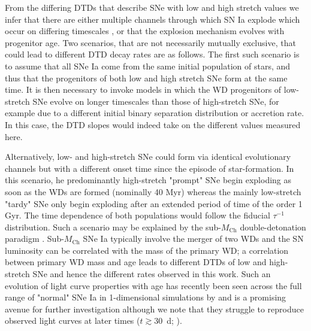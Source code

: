 \documentclass[fleqn,usenatbib]{mnras}
\providecommand{\DIFadd}[1]{\protect\cbstart{#1}\protect\cbend} %
\providecommand{\DIFaddbegin}{} %
\providecommand{\DIFaddend}{} %
\newcommand{\DIFaddincludegraphics}[2][]{{\color{blue}\fbox{\DIFOincludegraphics[#1]{#2}}}} %
\DeclareRobustCommand{\DIFaddbegin}{\DIFOaddbegin \let\includegraphics\DIFaddincludegraphics} %
\DeclareRobustCommand{\DIFaddend}{\DIFOaddend \let\includegraphics\DIFOincludegraphics} %
\begin{document}
From the differing DTDs that describe SNe with low and high stretch values we infer that there are either multiple channels through which SN Ia explode which occur on differing timescales \DIFaddbegin \DIFadd{(as discussed in \citet{Hakobyan2020})}\DIFaddend , or that the explosion mechanism evolves with progenitor age. Two scenarios, that are not necessarily mutually exclusive, that could lead to different DTD decay rates are as follows. 
The first such scenario is to assume that all SNe Ia come from the same initial population of stars, and thus that the progenitors of both low and high stretch SNe form at the same time. It is then necessary to invoke models in which the WD progenitors of low-stretch SNe evolve on longer timescales than those of high-stretch SNe, for example due to a different initial binary separation distribution or accretion rate. In this case, the DTD slopes would indeed take on the different values measured here.

Alternatively, low- and high-stretch SNe could form via identical evolutionary channels but with a different onset time since the episode of star-formation. In this scenario, he predominantly high-stretch "prompt" SNe begin exploding as soon as the WDs are formed (nominally 40 Myr) whereas the mainly low-stretch "tardy" SNe only begin exploding after an extended period of time of the order 1 Gyr. The time dependence of both populations would follow the fiducial $\tau^{-1}$ distribution.
Such a scenario may be explained by the sub-$M_{\mathrm{Ch}}$ double-detonation paradigm \citep[e.g.][]{Sim2010,Blondin2017,Shen2017}. Sub-$M_{\mathrm{Ch}}$ SNe Ia typically involve the merger of two WDs and the SN luminosity can be correlated with the mass of the primary WD; a correlation between primary WD mass and age leads to different DTDs of low and high-stretch SNe and hence the different rates observed in this work. Such an evolution of light curve properties with age has recently been seen across the full range of "normal" SNe Ia in 1-dimensional simulations by \citet{Shen2021} and is a promising avenue for further investigation although we note that they struggle to reproduce observed light curves at later times ($t\gtrsim30$~d; \citealt{Shen2021,Gronow2021}).
\end{document}
